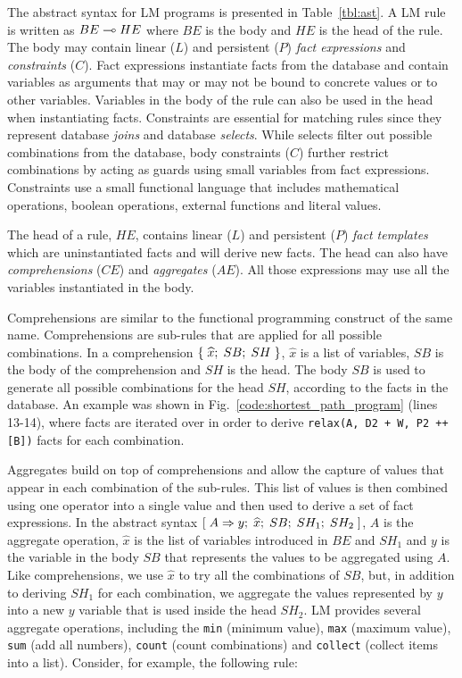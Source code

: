 The abstract syntax for LM programs is presented in Table~\ref{tbl:ast}.  A LM
rule is written as $BE \multimap HE$ where $BE$ is the body and $HE$ is the head of
the rule. The body may contain linear ($L$) and persistent ($P$) \emph{fact
   expressions} and \emph{constraints} ($C$). Fact expressions instantiate facts
from the database and contain variables as arguments that may or may not be
bound to concrete values or to other variables.  Variables in the body of the
rule can also be used in the head when instantiating facts.  Constraints are
essential for matching rules since they represent database \emph{joins} and
database \emph{selects}.  While selects filter out possible combinations from
the database, body constraints ($C$) further restrict combinations by acting as
guards using small variables from fact expressions.  Constraints use a small
functional language that includes mathematical operations, boolean operations,
external functions and literal values.

The head of a rule, $HE$, contains linear ($L$) and persistent ($P$) \emph{fact
   templates} which are uninstantiated facts and will derive new facts. The head
can also have \emph{comprehensions} ($CE$) and \emph{aggregates} ($AE$). All
those expressions may use all the variables instantiated in the body.

Comprehensions are similar to the functional programming construct of the same
name.  Comprehensions are sub-rules that are applied for all possible
combinations. In a comprehension $\{ \; \widehat{x}; \; SB; \; SH \; \}$,
$\widehat{x}$ is a list of variables, $SB$ is the body of the comprehension and
$SH$ is the head. The body $SB$ is used to generate all possible combinations
for the head $SH$, according to the facts in the database.  An example was shown
in Fig.~\ref{code:shortest_path_program} (lines 13-14), where  facts are iterated over in order to derive \texttt{relax(A, D2
   + W, P2 ++ [B])} facts for each combination.

Aggregates build on top of comprehensions and allow the capture of values that
appear in each combination of the sub-rules. This list of values is then
combined using one operator into a single value and then used to derive a set of
fact expressions. In the abstract syntax
$[\; A \Rightarrow y; \; \widehat{x}; \; SB; \; SH_1; \; SH_2 \;]$, $A$ is the aggregate operation,
$\widehat{x}$ is the list of variables introduced in $BE$ and $SH_1$ and $y$ is
the variable in the body $SB$ that represents the values to be aggregated using
$A$. Like comprehensions, we use $\widehat{x}$ to try all the combinations of
$SB$, but, in addition to deriving $SH_1$ for each combination, we aggregate the
values represented by $y$ into a new $y$ variable that is used inside the head
$SH_2$.  LM provides several aggregate operations, including the \texttt{min}
(minimum value), \texttt{max} (maximum value), \texttt{sum} (add all numbers),
\texttt{count} (count combinations) and \texttt{collect} (collect items into a
list). Consider, for example, the following rule:

